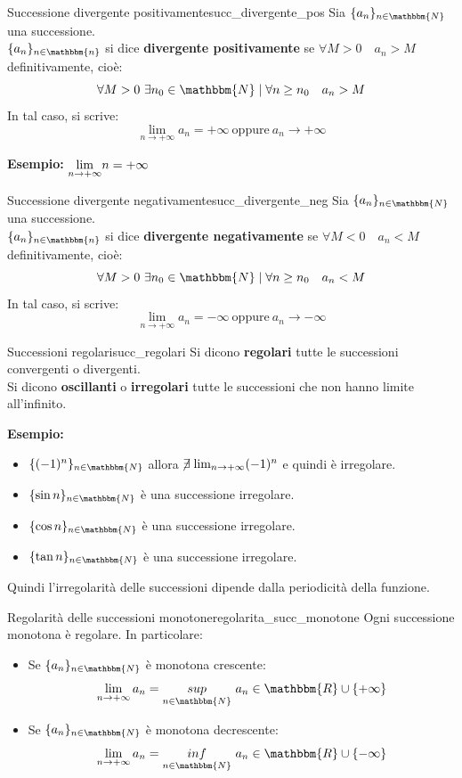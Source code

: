 \documentclass[12pt]{report}
\newcounter{theorem}
\newcounter{definition}
\newcommand{\nmu}{}
\begin{document}
	\begin{definition}{\nmu Successione divergente positivamente}{succ_divergente_pos}
		Sia $\{a_n\}_{n \in \mathbbm{N}}$ una successione. \\
		$\{a_n\}_{n \in \mathbbm{n}}$ si dice \textbf{divergente positivamente} se $\forall M > 0 \quad a_n > M$ definitivamente, cioè:
		\[
		\forall M > 0\ \exists n_0 \in \mathbbm{N} \mid \forall n \geq n_0 \quad a_n > M
		\]
		In tal caso, si scrive:
		\[
		\lim_{n \to +\infty}a_n = +\infty\ \text{oppure}\ a_n \to +\infty
		\]
	\end{definition}
	\textbf{Esempio:} $\mathlarger{\lim_{n \to +\infty}}n = +\infty$
	\begin{definition}{\nmu Successione divergente negativamente}{succ_divergente_neg}
		Sia $\{a_n\}_{n \in \mathbbm{N}}$ una successione. \\
		$\{a_n\}_{n \in \mathbbm{n}}$ si dice \textbf{divergente negativamente} se $\forall M < 0 \quad a_n < M$ definitivamente, cioè:
		\[
		\forall M > 0\ \exists n_0 \in \mathbbm{N} \mid \forall n \geq n_0 \quad a_n < M
		\]
		In tal caso, si scrive:
		\[
		\lim_{n \to +\infty}a_n = -\infty\ \text{oppure}\ a_n \to -\infty
		\]
	\end{definition}
	\begin{definition}{\nmu Successioni regolari}{succ_regolari}
		Si dicono \textbf{regolari} tutte le successioni convergenti o divergenti. \\
		Si dicono \textbf{oscillanti} o \textbf{irregolari} tutte le successioni che non hanno limite all'infinito.
	\end{definition}
	\textbf{Esempio:}
	\begin{itemize}
		\item $\{(-1)^n\}_{n \in \mathbbm{N}}$ allora $\centernot{\exists} \lim_{n \to +\infty}(-1)^n$ e quindi è irregolare.
		\item $\{\sin n\}_{n \in \mathbbm{N}}$ è una successione irregolare.
		\item $\{\cos n\}_{n \in \mathbbm{N}}$ è una successione irregolare.
		\item $\{\tan n\}_{n \in \mathbbm{N}}$ è una successione irregolare.
	\end{itemize}
	Quindi l'irregolarità delle successioni dipende dalla periodicità della funzione. \\
	\begin{theorem}{\nmu Regolarità delle successioni monotone}{regolarita_succ_monotone}
		Ogni successione monotona è regolare. In particolare:
		\begin{itemize}
			\item Se $\{a_n\}_{n \in \mathbbm{N}}$ è monotona crescente:
			\[
			\lim_{n \to +\infty}a_n = \underset{n \in \mathbbm{N}}{sup}\ a_n \in \mathbbm{R} \cup \{+\infty\}
			\]
			\item Se $\{a_n\}_{n \in \mathbbm{N}}$ è monotona decrescente:
			\[
			\lim_{n \to +\infty}a_n = \underset{n \in \mathbbm{N}}{inf}\ a_n \in \mathbbm{R} \cup \{-\infty\}
			\]
		\end{itemize}
	\end{theorem}
\end{document}
